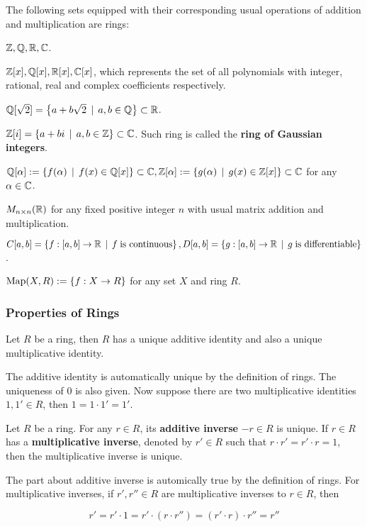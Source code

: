 \documentclass[a4paper,12pt]{article}
\begin{document}
\begin{exm}
  The following sets equipped with their corresponding usual operations of addition and multiplication are rings:

  \begin{alist}
    \item $\mathbb{Z},\mathbb{Q},\mathbb{R},\mathbb{C}$.
    \item $\mathbb{Z}[x],\mathbb{Q}[x],\mathbb{R}[x],\mathbb{C}[x]$, which represents the set of all polynomials with integer, rational, real and complex coefficients respectively.
    \item $\mathbb{Q}[\sqrt{2}]=\left\{ a+b\sqrt{2}\,\mid\, a,b\in\mathbb{Q}\right\}\subset\mathbb{R}$.
    \item $\mathbb{Z}[i]=\left\{ a+bi\,\mid\, a,b\in\mathbb{Z}\right\}\subset\mathbb{C}$. Such ring is called the \textbf{ring of Gaussian integers}.
    \item $\mathbb{Q}[\alpha]:=\left\{ f(\alpha)\,\mid\, f(x)\in\mathbb{Q}[x]\right\}\subset\mathbb{C},\mathbb{Z}[\alpha]:=\left\{ g(\alpha)\,\mid\, g(x)\in\mathbb{Z}[x]\right\}\subset\mathbb{C}$ for any $\alpha\in\mathbb{C}$.
    \item $M_{n\times n}(\mathbb{R})$ for any fixed positive integer $n$ with usual matrix addition and multiplication.
    \item $C[a,b]=\left\{ f:[a,b]\to\mathbb{R}\,\mid\, f\;\text{is continuous}\right\},D[a,b]=\left\{ g:[a,b]\to\mathbb{R}\,\mid\, g\;\text{is differentiable}\right\}$.
    \item $\text{Map}(X,R):=\left\{ f:X\to R\right\}$ for any set $X$ and ring $R$.
  \end{alist}
\end{exm}

\subsubsection{Properties of Rings}
\begin{pst}
  Let $R$ be a ring, then $R$ has a unique additive identity and also a unique multiplicative identity.\n

  \prf The additive identity is automatically unique by the definition of rings. The uniqueness of $0$ is also given. Now suppose there are two multiplicative identities $1,1'\in R$, then $1=1\cdot 1'=1'$.
\end{pst}\n

\begin{pst}
  Let $R$ be a ring. For any $r\in R$, its \textbf{additive inverse} $-r\in R$ is unique. If $r\in R$ has a \textbf{multiplicative inverse}, denoted by $r'\in R$ such that $r\cdot r'=r'\cdot r=1$, then the multiplicative inverse is unique.\n

  \prf The part about additive inverse is automically true by the definition of rings. For multiplicative inverses, if $r',r''\in R$ are multiplicative inverses to $r\in R$, then

  $$r'=r'\cdot 1=r'\cdot(r\cdot r'')=(r'\cdot r)\cdot r''=r''$$
\end{pst}\n
\end{document}
